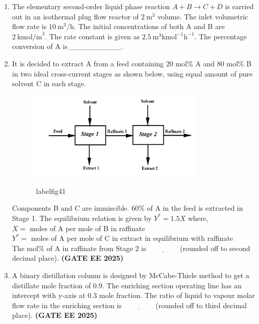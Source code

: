 \documentclass[journal,12pt,onecolumn]{IEEEtran}
\theoremstyle{remark}
\begin{document}
\begin{enumerate}
\item  The elementary second-order liquid phase reaction $A+B\rightarrow C+D$ is carried out in an isothermal plug flow reactor of $2~\text{m}^{3}$ volume. The inlet volumetric flow rate is $10~\text{m}^{3}/\text{h}$. The initial concentrations of both A and B are $2~\text{kmol/m}^{3}$. The rate constant is given as $2.5~\text{m}^{3} \text{kmol}^{-1} \text{h}^{-1}$. The percentage conversion of A is\_\_\_\_\_\_\_\_\_\_.




\item It is decided to extract A from a feed containing 20 mol\% A and 80 mol\% B in two ideal cross-current stages as shown below, using equal amount of pure solvent C in each stage.
	\begin{figure}
\begin{center}
\includegraphics[width=0.8\textwidth]{figs/41.png}
     \caption{}
      \ label{fig41}
\end{center}
	\end{figure}
Components B and C are immiscible. 60\% of A in the feed is extracted in Stage 1. The equilibrium relation is given by $Y^{*}=1.5 X$ where, \\
$X=$ moles of A per mole of B in raffinate \\
$Y^{*}=$ moles of A per mole of C in extract in equilibrium with raffinate
\\
The mol\% of A in raffinate from Stage 2 is$\underline{\hspace{2cm}}$(rounded off to second decimal place). \hfill \textbf{(GATE EE 2025)} 



\item A binary distillation column is designed by McCabe-Thiele method to get a distillate mole fraction of 0.9. The enriching section operating line has an intercept with y-axis at 0.3 mole fraction. The ratio of liquid to vapour molar flow rate in the enriching section is$\underline{\hspace{2cm}}$(rounded off to third decimal place). \hfill \textbf{(GATE EE 2025)} 




\end{enumerate}
\end{document}
